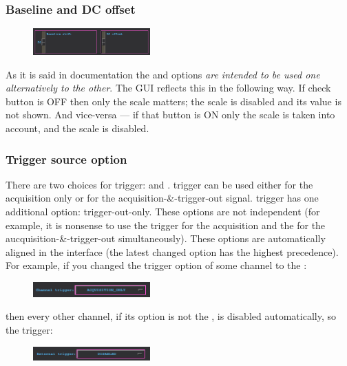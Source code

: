 \subsubsection*{Baseline and DC offset}
\begin{figure}[H]
    \centering
    \includegraphics[width=0.4\textwidth]{../pictures/documentation/gui/baseline.png}
\end{figure}
As it is said in  documentation the  and
 options \emph{are intended to be used one alternatively to the other}.
The GUI reflects this in the following way. If 
 check button is OFF then only the
 scale matters; the  scale is disabled and its value
is not shown. And vice-versa --- if that button is ON only
the  scale is taken into account, and the  scale is
disabled.

\subsubsection*{Trigger source option}
There are two choices for trigger:  and .
 trigger can be used either for the acquisition only or for the acquisition-\&-trigger-out signal.  trigger has one additional option: trigger-out-only.
These options are not independent (for example, it is nonsense to use the 
trigger for the acquisition and the  for the aucquisition-\&-trigger-out
simultaneously). These options are automatically aligned in the interface (the latest changed option has the highest precedence). For example, if you changed the  trigger option of some channel to the :
\begin{figure}[H]
    \centering
    \includegraphics[width=0.4\textwidth]{../pictures/documentation/gui/chan.png}
\end{figure}
\noindent then every other channel, if its option is not the , is disabled automatically, so
the  trigger:
\begin{figure}[H]
    \centering
    \includegraphics[width=0.4\textwidth]{../pictures/documentation/gui/ext.png}
\end{figure}

